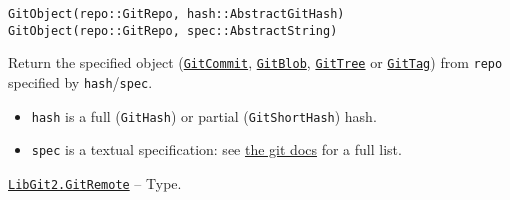 \begin{adjustwidth}{2em}{0pt}


\begin{verbatim}
GitObject(repo::GitRepo, hash::AbstractGitHash)
GitObject(repo::GitRepo, spec::AbstractString)
\end{verbatim}

Return the specified object (\hyperlink{5346527129202716606}{\texttt{GitCommit}}, \hyperlink{13272891135715880949}{\texttt{GitBlob}}, \hyperlink{6242150303858692069}{\texttt{GitTree}} or \hyperlink{10467695058580020738}{\texttt{GitTag}}) from \texttt{repo} specified by \texttt{hash}/\texttt{spec}.

\begin{itemize}
\item \texttt{hash} is a full (\texttt{GitHash}) or partial (\texttt{GitShortHash}) hash.


\item \texttt{spec} is a textual specification: see \href{https://git-scm.com/docs/git-rev-parse.html\#\_specifying\_revisions}{the git docs} for a full list.

\end{itemize}


\end{adjustwidth}
\hypertarget{9925970107179782013}{} 
\hyperlink{9925970107179782013}{\texttt{LibGit2.GitRemote}}  -- {Type.}

